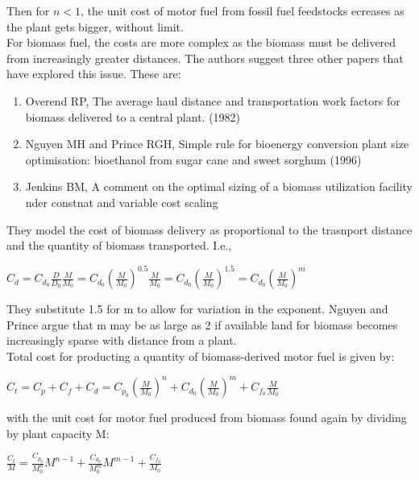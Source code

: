 \documentclass{article}\usepackage[]{graphicx}\usepackage[]{color}
\begin{document}
Then for $n<1$, the unit cost of motor fuel from fossil fuel feedstocks ecreases as the plant gets bigger, without limit. \\

For biomass fuel, the costs are more complex as the biomass must be delivered from increasingly greater distances.  The authors suggest three other papers that have explored this issue.  These are: \\

\begin{enumerate}
\item Overend RP, The average haul distance and transportation work factors for biomass delivered to a central plant. (1982)
\item Nguyen MH and Prince RGH, Simple rule for bioenergy conversion plant size optimisation: bioethanol from sugar cane and sweet sorghum (1996)
\item Jenkins BM, A comment on the optimal sizing of a biomass utilization facility nder constnat and variable cost scaling
\end{enumerate}

They model the cost of biomass delivery as proportional to the trasnport distance and the quantity of biomass transported.  I.e.,

\begin{centering}
$C_d = C_{d_0}\frac{D}{D_0}\frac{M}{M_0}=C_{d_0}(\frac{M}{M_0})^{0.5}\frac{M}{M_0}=C_{d_0}(\frac{M}{M_0})^{1.5}=C_{d_0}(\frac{M}{M_0})^m$
\end{centering}

They substitute 1.5 for m to allow for variation in the exponent.  Nguyen and Prince argue that m may be as large as 2 if available land for biomass becomes increasingly sparse with distance from a plant.  \\

Total cost for producting a quantity of biomass-derived motor fuel is given by:

\begin{centering}
$C_t = C_p + C_f+ C_d = C_{p_0}(\frac{M}{M_0})^n + C_{d_0}(\frac{M}{M_0})^m + C_{f_0}\frac{M}{M_0}$
\end{centering}

with the unit cost for motor fuel produced from biomass found again by dividing by plant capacity M:

\begin{centering}
$\frac{C_t}{M} = \frac{C_{p_0}}{M_0^n}M^{n-1} + \frac{C_{d_0}}{M_0^m}M^{m-1} + \frac{C_{f_0}}{M_0}$
\end{centering}
\end{document}
